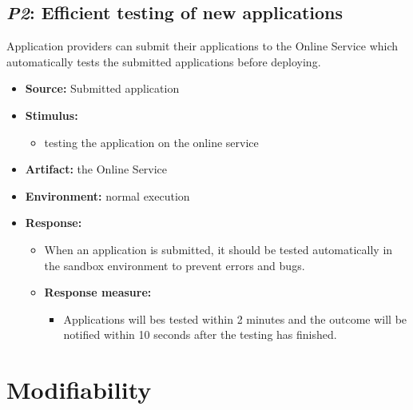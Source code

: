 \documentclass[english]{sareport}
\begin{document}
\subsection{\emph{P2}: Efficient testing of new applications}
Application providers can submit their applications to the Online Service which automatically tests the submitted applications before deploying.

\begin{itemize}
    \item \textbf{Source:} Submitted application
    \item \textbf{Stimulus:}
        \begin{itemize}
            \item testing the application on the online service
        \end{itemize}

    \item \textbf{Artifact:} the Online Service
    \item \textbf{Environment:} normal execution
    \item \textbf{Response:}
        \begin{itemize}
            \item When an application is submitted, it should be tested automatically in the sandbox environment to prevent errors and bugs.
    \item \textbf{Response measure:}
        \begin{itemize}
            \item Applications will bes tested within 2 minutes and the outcome will be notified within 10 seconds after the testing has finished.
        \end{itemize}
\end{itemize}

        \end{itemize}

\section{Modifiability}
\end{document}
